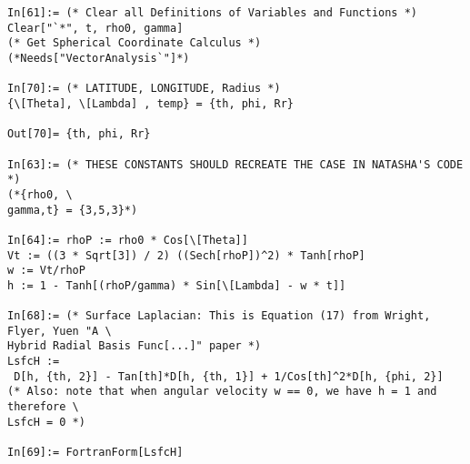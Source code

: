 \begin{verbatim} 
In[61]:= (* Clear all Definitions of Variables and Functions *)
Clear["`*", t, rho0, gamma]
(* Get Spherical Coordinate Calculus *)
(*Needs["VectorAnalysis`"]*)

In[70]:= (* LATITUDE, LONGITUDE, Radius *)
{\[Theta], \[Lambda] , temp} = {th, phi, Rr}

Out[70]= {th, phi, Rr}

In[63]:= (* THESE CONSTANTS SHOULD RECREATE THE CASE IN NATASHA'S CODE *)
(*{rho0, \
gamma,t} = {3,5,3}*)

In[64]:= rhoP := rho0 * Cos[\[Theta]]
Vt := ((3 * Sqrt[3]) / 2) ((Sech[rhoP])^2) * Tanh[rhoP]
w := Vt/rhoP 
h := 1 - Tanh[(rhoP/gamma) * Sin[\[Lambda] - w * t]]

In[68]:= (* Surface Laplacian: This is Equation (17) from Wright, Flyer, Yuen "A \
Hybrid Radial Basis Func[...]" paper *)
LsfcH := 
 D[h, {th, 2}] - Tan[th]*D[h, {th, 1}] + 1/Cos[th]^2*D[h, {phi, 2}]
(* Also: note that when angular velocity w == 0, we have h = 1 and therefore \
LsfcH = 0 *)

In[69]:= FortranForm[LsfcH]


\end{verbatim}
